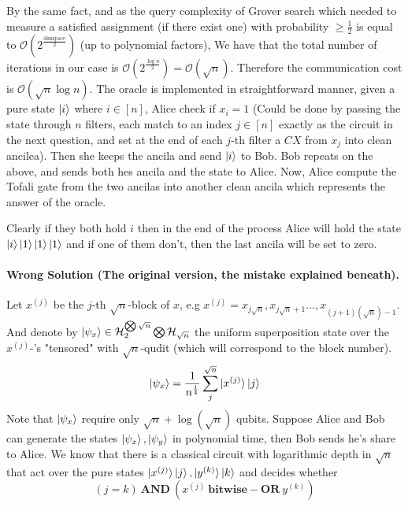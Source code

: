 \documentclass{article}
\begin{document}
By the same fact, and as the query complexity of Grover search which needed to measure a satisfied assignment (if there exist one) with probability \( \ge \frac{1}{2}\) is equal to \( \mathcal{O}( 2^{\frac{\dim \text{space}}{2}}) \) (up to polynomial factors), We have that the total number of iterations in our case is \( \mathcal{O}( 2^{ \frac{\log n}{2} }) = \mathcal{O}\left( \sqrt{n} \right)\). Therefore the communication cost is \( \mathcal{O}\left( \sqrt{n}\log n \right)\).  
The oracle is implemented in straightforward manner, given a pure state \( \ket{i} \) where \( i \in [n] \), Alice check if \(x_{i} = 1 \) (Could be done by passing the state through \(n\) filters, each match to an index \(j \in [n]\) exactly as the circuit in the next question, and set at the end of each \(j\)-th filter a \(CX\) from \(x_j\) into clean ancilea). Then she keeps the ancila and send \( \ket{i} \) to Bob. Bob repeats on the above, and sends both hes ancila and the state to Alice. Now, Alice compute the Tofali gate from the two ancilas into another clean ancila which represents the answer of the oracle.         

Clearly if they both hold \(i\) then in the end of the process Alice will hold the
state \(\ket{i}\ket{1}\ket{1}\ket{1}\) and if one of them don't, then the last ancila will be set to zero. 

\paragraph{Wrong Solution (The original version, the mistake explained beneath).}
Let \( x^{(j)} \) be the \(j\)-th \(\sqrt{n}\)-block of \(x\), e.g \(x^{(j)} = x_{j\sqrt{n}},x_{j\sqrt{n}+1}...,x_{(j+1)(\sqrt{n})-1}  \). And denote by \( \ket{\psi_x} \in \mathcal{H}_{2}^{\bigotimes \sqrt{n}} \bigotimes \mathcal{H}_{\sqrt{n}} \) the uniform superposition state over the \( x^{(j)}\)-'s "tensored" with \(\sqrt{n}\)-qudit (which will correspond to the block number).  \[ \ket{\psi_x} = \frac{1}{n^\frac{1}{4}}\sum_{j}^{\sqrt{n}}\ket{x^{(j)}}\ket{j} \] Note that \( \ket{\psi_x} \) require only \( \sqrt{n} + \log(\sqrt{n}) \) qubits. Suppose Alice and Bob can generate the states \( \ket{\psi_x}, \ket{\psi_y} \) in polynomial time, then Bob sends he's share to Alice. We know that there is a classical circuit with logarithmic depth in \( \sqrt{n} \) that act over the pure states \( \ket{x^{(j)}}\ket{j} , \ket{y^{(k)}}\ket{k} \) and decides whether \[ \left( j =  k \right) \ \mathbf{AND}  \ \left( x^{(j)} \ \mathbf{bitwise-OR} \  y^{(k)} \right)   \]
\end{document}
